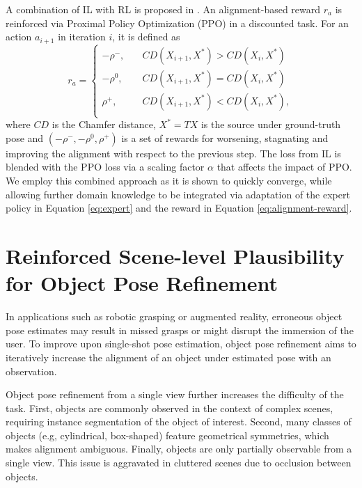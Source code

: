 \documentclass[10pt,twocolumn,letterpaper]{article}
\begin{document}
A combination of IL with RL is proposed in \cite{bauer2021reagent}. An alignment-based reward $r_a$ is reinforced via Proximal Policy Optimization (PPO) \cite{schulman2017ppo} in a discounted task. For an action $a_{i+1}$ in iteration $i$, it is defined as
\begin{equation}\label{eq:alignment-reward}
    r_a = \begin{cases}
        -\rho^-,   &\quad CD(X_{i+1}, X^*) > CD(X_{i}, X^*)\\
        -\rho^0,   &\quad CD(X_{i+1}, X^*) = CD(X_{i}, X^*)\\
        \rho^+,    &\quad CD(X_{i+1}, X^*) < CD(X_{i}, X^*),\\
    \end{cases}
\end{equation}
where $CD$ is the Chamfer distance, $X^*=TX$ is the source under ground-truth pose and $(-\rho^-,-\rho^0,\rho^+)$ is a set of rewards for worsening, stagnating and improving the alignment with respect to the previous step. 
The loss from IL is blended with the PPO loss via a scaling factor $\alpha$ that affects the impact of PPO. We employ this combined approach as it is shown to quickly converge, while allowing further domain knowledge to be integrated via adaptation of the expert policy in Equation \eqref{eq:expert} and the reward in Equation \eqref{eq:alignment-reward}.

\section{Reinforced Scene-level Plausibility for Object Pose Refinement}\label{sec:spore}
In applications such as robotic grasping or augmented reality, erroneous object pose estimates may result in missed grasps or might disrupt the immersion of the user. To improve upon single-shot pose estimation, object pose refinement aims to iteratively increase the alignment of an object under estimated pose with an observation.

Object pose refinement from a single view further increases the difficulty of the task. First, objects are commonly observed in the context of complex scenes, requiring instance segmentation of the object of interest. Second, many classes of objects (e.g, cylindrical, box-shaped) feature geometrical symmetries, which makes alignment ambiguous. Finally, objects are only partially observable from a single view. This issue is aggravated in cluttered scenes due to occlusion between objects. 
\end{document}
